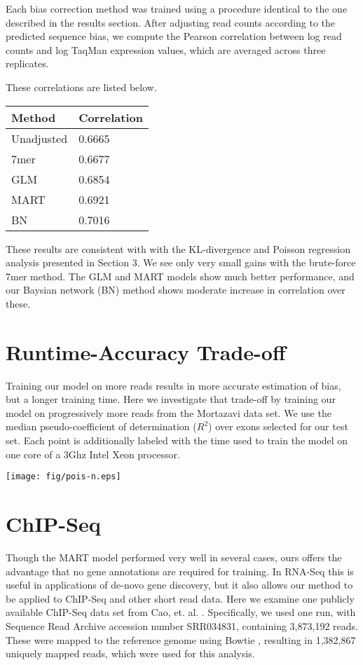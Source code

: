 \documentclass[letterpaper]{article}
\begin{document}
Each bias correction method was trained using a procedure identical to the one
described in the results section. After adjusting read counts according to the
predicted sequence bias, we compute the Pearson correlation between log read counts
and log TaqMan expression values, which are averaged across three replicates.

These correlations are listed below.

\begin{center}
\begin{tabular}{ll}
\textbf{Method} & \textbf{Correlation} \\ \hline
Unadjusted &  0.6665 \\
7mer &  0.6677 \\
GLM & 0.6854 \\
MART & 0.6921 \\
BN & 0.7016
\end{tabular}
\end{center}

These results are consistent with with the KL-divergence and Poisson regression
analysis presented in Section 3. We see only very small gains with the
brute-force 7mer method. The GLM and MART models show much better performance,
and our Baysian network (BN) method shows moderate increase in correlation over
these.



\section{Runtime-Accuracy Trade-off}

Training our model on more reads results in more accurate estimation of bias,
but a longer training time. Here we investigate that trade-off by training our
model on progressively more reads from the Mortazavi data set. We use the
median pseudo-coefficient of determination ($R^2$) over exons selected for our
test set. Each point is additionally labeled with the time used to train the
model on one core of a 3Ghz Intel Xeon processor.

\texttt{[image: fig/pois-n.eps]}



\section{ChIP-Seq}

Though the MART model \cite{Li2010} performed very well in several cases, ours
offers the advantage that no gene annotations are required for training.  In
RNA-Seq this is useful in applications of de-novo gene discovery, but it also
allows our method to be applied to ChIP-Seq and other short read data. Here we
examine one publicly available ChIP-Seq data set from Cao, et. al.
\cite{Cao2010}. Specifically, we used one run, with Sequence Read Archive
accession number SRR034831, containing 3,873,192 reads. These were mapped to the
reference genome using Bowtie \cite{Langmead2009}, resulting in 1,382,867
uniquely mapped reads, which were used for this analysis.
\end{document}
